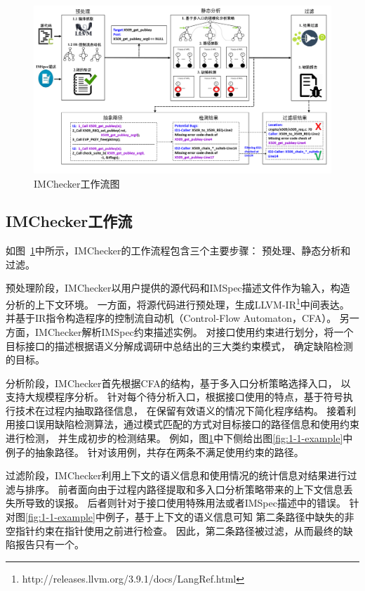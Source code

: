 \begin{figure}[b]
	\centering
	\includegraphics[width=\linewidth]{figures/cp3-3-overview.png}
	\caption{
		IMChecker工作流图
	}
	\label{fig:3-3-overview}
\end{figure}

\subsection{IMChecker工作流}

如图~\ref{fig:3-3-overview}中所示，IMChecker的工作流程包含三个主要步骤：
预处理、静态分析和过滤。

预处理阶段，IMChecker以用户提供的源代码和IMSpec描述文件作为输入，构造分析的上下文环境。
一方面，将源代码进行预处理，生成LLVM-IR\footnote{http://releases.llvm.org/3.9.1/docs/LangRef.html}中间表达。
并基于IR指令构造程序的控制流自动机（Control-Flow Automaton，CFA）。
另一方面，IMChecker解析IMSpec约束描述实例。
对接口使用约束进行划分，将一个目标接口的描述根据语义分解成调研中总结出的三大类约束模式，
确定缺陷检测的目标。

分析阶段，IMChecker首先根据CFA的结构，基于多入口分析策略选择入口，
以支持大规模程序分析。
针对每个待分析入口，根据接口使用的特点，基于符号执行技术在过程内抽取路径信息，
在保留有效语义的情况下简化程序结构。
接着利用接口误用缺陷检测算法，通过模式匹配的方式对目标接口的路径信息和使用约束进行检测，
并生成初步的检测结果。
例如，图\ref{fig:3-3-overview}中下侧给出图\ref{fig:1-1-example}中例子的抽象路径。
针对该用例，共存在两条不满足使用约束的路径。

过滤阶段，IMChecker利用上下文的语义信息和使用情况的统计信息对结果进行过滤与排序。
前者面向由于过程内路径提取和多入口分析策略带来的上下文信息丢失所导致的误报。
后者则针对于接口使用特殊用法或者IMSpec描述中的错误。
针对图\ref{fig:1-1-example}中例子，基于上下文的语义信息可知
第二条路径中缺失的非空指针约束在指针使用之前进行检查。
因此，第二条路径被过滤，从而最终的缺陷报告只有一个。

